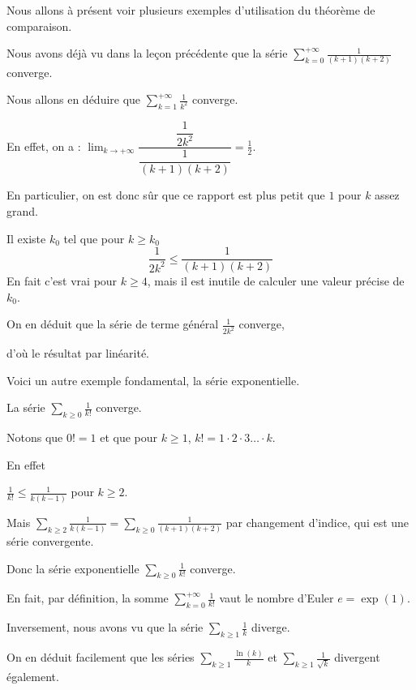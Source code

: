 Nous allons à présent voir plusieurs exemples d'utilisation du théorème de comparaison.

\change
Nous avons déjà vu dans la leçon précédente que la
série $\displaystyle\sum_{k=0}^{+\infty} \frac{1}{(k+1)(k+2)}$ converge. 

Nous allons en déduire que $\displaystyle\sum_{k=1}^{+\infty} \frac{1}{k^2}$ converge.

\change
En effet, on a :
$
\displaystyle\lim_{k\to+\infty}
\dfrac{\dfrac{1}{2k^2}}{\dfrac{1}{(k+1)(k+2)}}=\frac{1}{2}. 
$

En particulier, on est donc sûr que ce rapport est plus petit que $1$ pour $k$ assez grand.

\change
Il existe $k_0$ tel que pour $k \ge k_0$ 
$$
\frac{1}{2k^2} \le \frac{1}{(k+1)(k+2)}
$$
En fait c'est vrai pour $k \ge 4$, mais il est inutile de calculer une
valeur précise de $k_0$. 

\change
On en déduit que la série de terme
général $\frac{1}{2k^2}$ converge,

\change
d'où le résultat par
linéarité.  


\diapo

Voici un autre exemple fondamental, la série exponentielle.

La série $\displaystyle\sum_{k\ge 0} \frac{1}{k!}$ converge.

Notons que $0!=1$ et que pour $k\ge 1$, $k!=1\cdot 2\cdot 3\dots \cdot k$.

\change
En effet 

$\frac{1}{k!}\le \frac{1}{k(k-1)}$ pour $k \ge 2$.

\change
Mais $\displaystyle\sum_{k \ge 2}\frac{1}{k(k-1)} =\displaystyle \sum_{k\ge0} \frac{1}{(k+1)(k+2)}$ par changement d'indice, qui est une série convergente.

\change
Donc la série exponentielle $\displaystyle\sum_{k\ge 0} \frac{1}{k!}$ converge.

\change
En fait, par définition, la somme $\displaystyle\sum_{k=0}^{+\infty} \frac{1}{k!}$ vaut le nombre d'Euler $e = \exp(1)$.


\diapo
Inversement, nous avons vu que la série $\displaystyle\sum_{k\ge1} \frac{1}{k}$
diverge. 

\change
On en déduit facilement que les séries 
$\displaystyle\sum_{k\ge1} \frac{\ln(k)}{k}$ et $\displaystyle\sum_{k\ge1} \frac{1}{\sqrt{k}}$ divergent également.  

